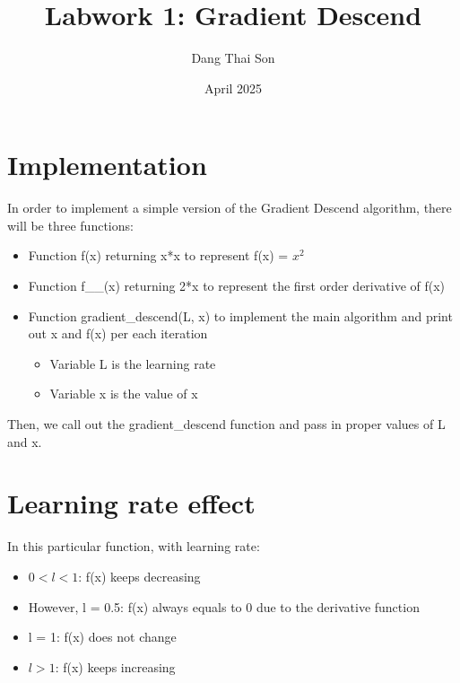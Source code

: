 \documentclass{article}
\title{Labwork 1: Gradient Descend}
\author{Dang Thai Son}
\date{April 2025}
\begin{document}
\maketitle

\section{Implementation}
In order to implement a simple version of the Gradient Descend algorithm, there will be three functions:
\begin{itemize}
    \item Function f(x) returning x*x to represent f(x) = $x^2$
    \item Function f\_\_(x) returning 2*x to represent the first order derivative of f(x)
    \item Function gradient\_descend(L, x) to implement the main algorithm and print out x and f(x) per each iteration
    \begin{itemize}
        \item Variable L is the learning rate
        \item Variable x is the value of x
    \end{itemize}
\end{itemize}
Then, we call out the gradient\_descend function and pass in proper values of L and x.

\section{Learning rate effect}
In this particular function, with learning rate:
\begin{itemize}
    \item $0 < l < 1$: f(x) keeps decreasing
    \item However, l = 0.5: f(x) always equals to 0 due to the derivative function 
    \item l = 1: f(x) does not change
    \item $l > 1$: f(x) keeps increasing
\end{itemize}
\end{document}
